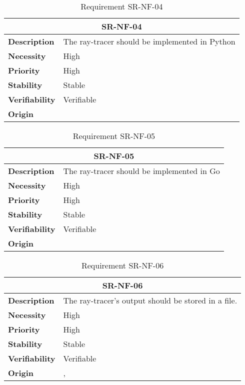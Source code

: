 \begin{table}[H]
    \centering
    \begin{tabular}{l p{10cm}}
        \toprule
        \multicolumn{2}{c}{SR-NF-04} \\
        \toprule
        \textbf{Description}        & The ray-tracer should be implemented in Python \\
        \textbf{Necessity}          &  High \\
        \textbf{Priority}           &  High \\
        \textbf{Stability}          &  Stable \\
        \textbf{Verifiability}      & Verifiable \\
        \textbf{Origin}             &  \textit{\nameref{tab:ur-re-01}} \\
    \end{tabular}
    \caption{Requirement SR-NF-04}
    \label{tab:sr-nf-04}
\end{table}

\begin{table}[H]
    \centering
    \begin{tabular}{l p{10cm}}
        \toprule
        \multicolumn{2}{c}{SR-NF-05} \\
        \toprule
        \textbf{Description}        & The ray-tracer should be implemented in Go \\
        \textbf{Necessity}          &  High \\
        \textbf{Priority}           &  High \\
        \textbf{Stability}          &  Stable \\
        \textbf{Verifiability}      & Verifiable \\
        \textbf{Origin}             &  \textit{\nameref{tab:ur-re-01}} \\
    \end{tabular}
    \caption{Requirement SR-NF-05}
    \label{tab:sr-nf-05}
\end{table}

\begin{table}[H]
    \centering
    \begin{tabular}{l p{10cm}}
        \toprule
        \multicolumn{2}{c}{SR-NF-06} \\
        \toprule
        \textbf{Description}        & The ray-tracer's output should be stored in a file. \\
        \textbf{Necessity}          &  High \\
        \textbf{Priority}           &  High \\
        \textbf{Stability}          &  Stable \\
        \textbf{Verifiability}      & Verifiable \\
        \textbf{Origin}             &  \textit{\nameref{tab:ur-ca-04}}, \textit{\nameref{tab:ur-ca-14}} \\
    \end{tabular}
    \caption{Requirement SR-NF-06}
    \label{tab:sr-nf-06}
\end{table}

